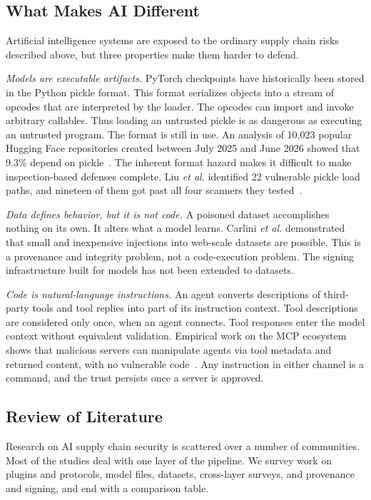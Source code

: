 \documentclass[conference]{IEEEtran}
\begin{document}
\subsection{What Makes AI Different}
\label{sec:why-ai-differs}

Artificial intelligence systems are exposed to the ordinary supply chain risks described above, but three properties make them harder to defend.

\emph{Models are executable artifacts.} PyTorch checkpoints have historically been stored in the Python pickle format. This format serializes objects into a stream of opcodes that are interpreted by the loader. The opcodes can import and invoke arbitrary callables. Thus loading an untrusted pickle is as dangerous as executing an untrusted program. The format is still in use. An analysis of 10,023 popular Hugging Face repositories created between July 2025 and June 2026 showed that 9.3\% depend on pickle~\cite{qin2026}. The inherent format hazard makes it difficult to make inspection-based defenses complete. Liu \textit{et al.} identified 22 vulnerable pickle load paths, and nineteen of them got past all four scanners they tested~\cite{liu2025}.

\emph{Data defines behavior, but it is not code.} A poisoned dataset accomplishes nothing on its own. It alters what a model learns. Carlini \textit{et al.} demonstrated that small and inexpensive injections into web-scale datasets are possible. This is a provenance and integrity problem, not a code-execution problem. The signing infrastructure built for models has not been extended to datasets.

\emph{Code is natural-language instructions.} An agent converts descriptions of third-party tools and tool replies into part of its instruction context. Tool descriptions are considered only once, when an agent connects. Tool responses enter the model context without equivalent validation. Empirical work on the MCP ecosystem shows that malicious servers can manipulate agents via tool metadata and returned content, with no vulnerable code~\cite{song2025}. Any instruction in either channel is a command, and the trust persists once a server is approved.

\subsection{Review of Literature}
\label{sec:literature}

Research on AI supply chain security is scattered over a number of communities. Most of the studies deal with one layer of the pipeline. We survey work on plugins and protocols, model files, datasets, cross-layer surveys, and provenance and signing, and end with a comparison table.
\end{document}
